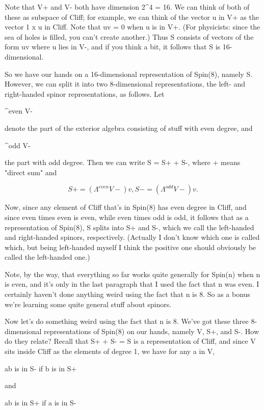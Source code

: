 Note that \Lambda  V+ and \Lambda  V- both have dimension 2^4 = 16.  We
can think of both of these as subspace of Cliff; for example, we can
think of the vector u in \Lambda  V+ as the vector 1 x u in Cliff.  Note
that uv = 0 when u is in \Lambda  V+.  (For physicists: since the sea of
holes is filled, you can't create another.)  Thus S consists of
vectors of the form uv where u lies in \Lambda  V-, and if you think a
bit, it follows that S is 16-dimensional.

So we have our hands on a 16-dimensional representation of Spin(8),
namely S.  However, we can split it into two 8-dimensional
representations, the left- and right-handed spinor representations, 
as follows.   Let 

\Lambda ^{even} V- 

denote the part of the exterior algebra consisting of stuff with
even degree, and 

\Lambda ^{odd} V- 

the part with odd degree.  Then we can write S = S+ + S-, where
+ means "direct sum" and

$$
S+ = (\Lambda ^{even} V-)v ,  S- = (\Lambda ^{odd} V-)v.
$$
    

Now, since any element of Cliff that's in Spin(8) has even degree
in Cliff, and since even times even is even, while even times odd
is odd, it follows that as a representation of Spin(8), S splits
into S+ and S-, which we call the left-handed and right-handed spinors,
respectively.  (Actually I don't know which one is called which, but
being left-handed myself I think the positive one should obviously be
called the left-handed one.)  

Note, by the way, that everything so far works quite generally for
Spin(n) when n is even, and it's only in the last paragraph that I
used the fact that n was even.  I certainly haven't done anything
weird using the fact that n is 8.  So as a bonus we're learning some
quite general stuff about spinors.

Now let's do something weird using the fact that n is 8.  We've got
these three 8-dimensional representations of Spin(8) on our hands,
namely V, S+, and S-.  How do they relate?  Recall that S+ + S- = S
is a representation of Cliff, and since V sits inside Cliff as the elements
of degree 1, we have for any a in V,

ab is in S- if b is in S+

and

ab is in S+ if a is in S-

